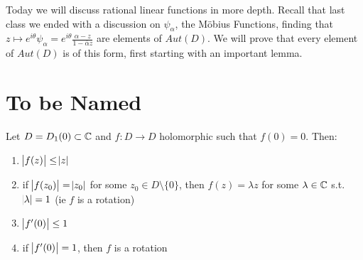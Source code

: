 \setcounter{section}{0}
\setcounter{theorem}{0}



Today we will discuss rational linear functions in more depth. Recall that last class we ended with a discussion on $\psi_\alpha$, the M{\"o}bius Functions, finding that $z \mapsto e^{i \theta} \psi_\alpha = e^{i \theta} \frac{\alpha - z}{ 1 - \overline{\alpha} z}$ are elements of $Aut(D)$. We will prove that every element of $Aut(D)$ is of this form, first starting with an important lemma.

\section{To be Named}

\begin{theorem}

Let $D = D_1(0) \subset \mathbb{C}$ and $f: D \to D$ holomorphic such that $f(0) = 0$. Then:

\begin{enumerate}
    \item $\abs{f(z)} \leq \abs{z}$
    \item if $\abs{f(z_0)} = \abs{z_0}$ for some $z_0 \in D \setminus \{ 0 \}$, then $f (z) = \lambda z$ for some $\lambda \in \mathbb{C}$ s.t. $\abs{\lambda} = 1$ (ie $f$ is a rotation)
    \item  $\abs{f'(0)} \leq 1$
    \item if $\abs{f'(0)} = 1$, then $f$ is a rotation
\end{enumerate}


\end{theorem}







